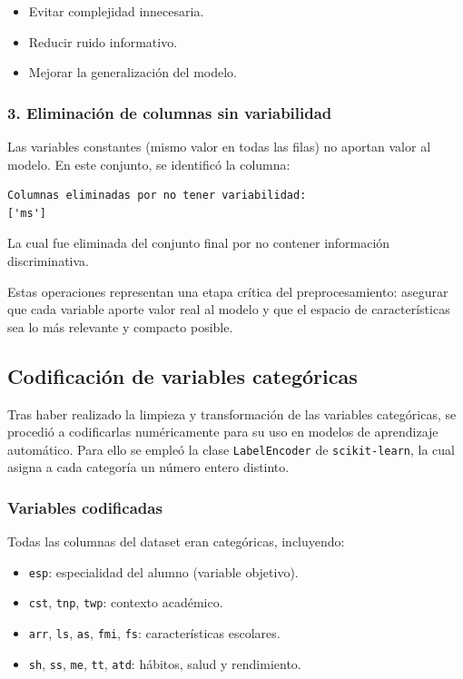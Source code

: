 \documentclass[11pt,a4paper]{article}
\begin{document}
\begin{itemize}
    \item Evitar complejidad innecesaria.
    \item Reducir ruido informativo.
    \item Mejorar la generalización del modelo.
\end{itemize}

\subsubsection*{3. Eliminación de columnas sin variabilidad}

Las variables constantes (mismo valor en todas las filas) no aportan valor al modelo. En este conjunto, se identificó la columna:

\begin{verbatim}
Columnas eliminadas por no tener variabilidad:
['ms']
\end{verbatim}

La cual fue eliminada del conjunto final por no contener información discriminativa.

\medskip

Estas operaciones representan una etapa crítica del preprocesamiento: asegurar que cada variable aporte valor real al modelo y que el espacio de características sea lo más relevante y compacto posible.

\subsection{Codificación de variables categóricas}

Tras haber realizado la limpieza y transformación de las variables categóricas, se procedió a codificarlas numéricamente para su uso en modelos de aprendizaje automático. Para ello se empleó la clase \texttt{LabelEncoder} de \texttt{scikit-learn}, la cual asigna a cada categoría un número entero distinto.

\medskip

\subsubsection*{Variables codificadas}

Todas las columnas del dataset eran categóricas, incluyendo:

\begin{itemize}
    \item \texttt{esp}: especialidad del alumno (variable objetivo).
    \item \texttt{cst}, \texttt{tnp}, \texttt{twp}: contexto académico.
    \item \texttt{arr}, \texttt{ls}, \texttt{as}, \texttt{fmi}, \texttt{fs}: características escolares.
    \item \texttt{sh}, \texttt{ss}, \texttt{me}, \texttt{tt}, \texttt{atd}: hábitos, salud y rendimiento.
\end{itemize}
\end{document}
